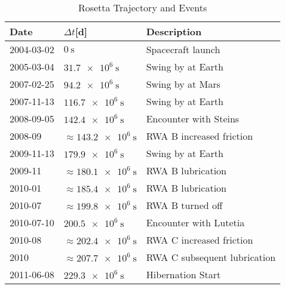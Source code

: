 \begin{table}[htb]
\centering
\caption{Rosetta Trajectory and Events}
\begin{tabular}{b{}b{}b{}}
\toprule
Date 		& $\Delta t$[d] 						& Description \\  \midrule
2004-03-02	& $\SI{0}{\second}$				& Spacecraft launch \\
2005-03-04	& $\SI{31.7e6}{\second}$				& Swing by at Earth \\
2007-02-25	& $\SI{94.2e6}{\second}$				& Swing by at Mars \\
2007-11-13	& $\SI{116.7e6}{\second}$				& Swing by at Earth \\
2008-09-05	& $\SI{142.4e6}{\second}$				& Encounter with Steins \\
2008-09		& $\approx\SI{143.2e6}{\second}$		& RWA B increased friction \\
2009-11-13	& $\SI{179.9e6}{\second}$				& Swing by at Earth \\
2009-11		& $\approx\SI{180.1e6}{\second}$		& RWA B lubrication \\
2010-01		& $\approx\SI{185.4e6}{\second}$		& RWA B lubrication \\
2010-07		& $\approx\SI{199.8e6}{\second}$		& RWA B turned off \\
2010-07-10	& $\SI{200.5e6}{\second}$				& Encounter with Lutetia \\
2010-08		& $\approx\SI{202.4e6}{\second}$		& RWA C increased friction \\
2010			& $\approx\SI{207.7e6}{\second}$		& RWA C subsequent lubrication \\
2011-06-08	&  $\SI{229.3e6}{\second}$			& Hibernation Start \\
\bottomrule
\end{tabular}
\label{t:rosetta_trajectory}
\end{table}